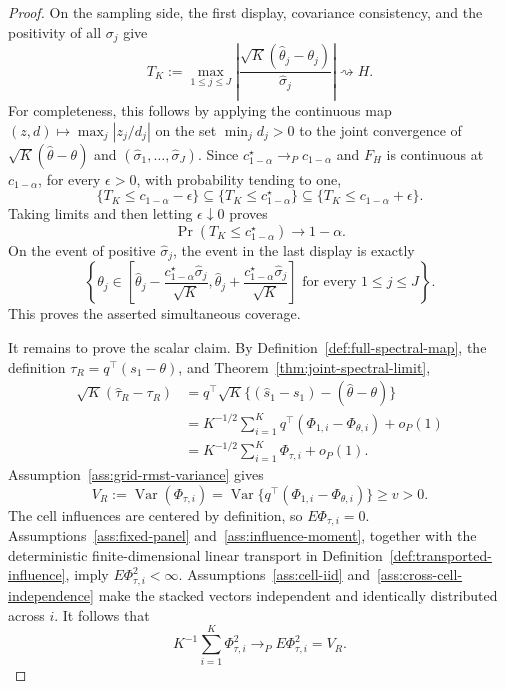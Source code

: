 \documentclass{article}
\begin{document}
\begin{proof}
On the sampling side, the first display, covariance consistency, and the positivity of all \(\sigma_j\) give
\[
 T_K:=\max_{1\le j\le J}
 \left|\frac{\sqrt K(\widehat\theta_j-\theta_j)}{\widehat\sigma_j}\right|
 \rightsquigarrow H.
\]
For completeness, this follows by applying the continuous map
\((z,d)\mapsto\max_j|z_j/d_j|\) on the set \(\min_jd_j>0\) to the joint convergence of \(\sqrt K(\widehat\theta-\theta)\) and \((\widehat\sigma_1,\ldots,\widehat\sigma_J)\).  Since \(c_{1-\alpha}^\star\to_Pc_{1-\alpha}\) and \(F_H\) is continuous at \(c_{1-\alpha}\), for every \(\epsilon>0\), with probability tending to one,
\[
 \{T_K\le c_{1-\alpha}-\epsilon\}
 \subseteq\{T_K\le c_{1-\alpha}^\star\}
 \subseteq\{T_K\le c_{1-\alpha}+\epsilon\}.
\]
Taking limits and then letting \(\epsilon\downarrow0\) proves
\[
 \Pr(T_K\le c_{1-\alpha}^\star)\longrightarrow1-\alpha.
\]
On the event of positive \(\widehat\sigma_j\), the event in the last display is exactly
\[
 \left\{\theta_j\in
 \left[\widehat\theta_j-\frac{c_{1-\alpha}^\star\widehat\sigma_j}{\sqrt K},
       \widehat\theta_j+\frac{c_{1-\alpha}^\star\widehat\sigma_j}{\sqrt K}\right]
 \text{ for every }1\le j\le J\right\}.
\]
This proves the asserted simultaneous coverage.

It remains to prove the scalar claim.  By Definition~\ref{def:full-spectral-map}, the definition \(\tau_R=q^\top(s_1-\theta)\), and Theorem~\ref{thm:joint-spectral-limit},
\[
\begin{aligned}
 \sqrt K(\widehat\tau_R-\tau_R)
 &=q^\top\sqrt K\{(\widehat s_1-s_1)-(\widehat\theta-\theta)\}\\
 &=K^{-1/2}\sum_{i=1}^Kq^\top(\Phi_{1,i}-\Phi_{\theta,i})+o_P(1)\\
 &=K^{-1/2}\sum_{i=1}^K\Phi_{\tau,i}+o_P(1).
\end{aligned}
\]
Assumption~\ref{ass:grid-rmst-variance} gives
\[
 V_R:=\operatorname{Var}(\Phi_{\tau,i})
 =\operatorname{Var}\{q^\top(\Phi_{1,i}-\Phi_{\theta,i})\}
 \ge v>0.
\]
The cell influences are centered by definition, so \(E\Phi_{\tau,i}=0\).  Assumptions~\ref{ass:fixed-panel} and~\ref{ass:influence-moment}, together with the deterministic finite-dimensional linear transport in Definition~\ref{def:transported-influence}, imply \(E\Phi_{\tau,i}^2<\infty\).  Assumptions~\ref{ass:cell-iid} and~\ref{ass:cross-cell-independence} make the stacked vectors independent and identically distributed across \(i\).  It follows that
\[
 K^{-1}\sum_{i=1}^K\Phi_{\tau,i}^2\longrightarrow_P
 E\Phi_{\tau,i}^2=V_R.
\]


\end{proof}
\end{document}

